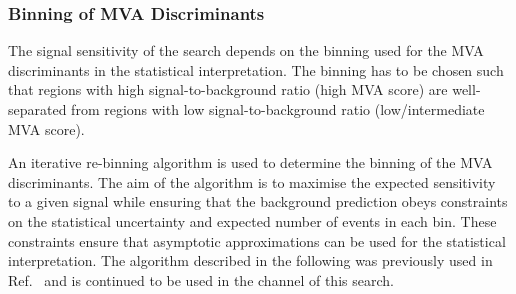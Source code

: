 \subsubsection{Binning of MVA Discriminants}%
\label{sec:binning_alg}

The signal sensitivity of the search depends on the binning used for the MVA
discriminants in the statistical interpretation. The binning has to be chosen
such that regions with high signal-to-background ratio (high MVA score) are
well-separated from regions with low signal-to-background ratio
(low/intermediate MVA score).

An iterative re-binning algorithm is used to determine the binning of the MVA
discriminants. The aim of the algorithm is to maximise the expected sensitivity
to a given signal while ensuring that the background prediction obeys
constraints on the statistical uncertainty and expected number of events in each
bin. These constraints ensure that asymptotic approximations can be used for the
statistical interpretation. The algorithm described in the following was
previously used in Ref.~\cite{HIGG-2016-16-witherratum} and is continued to be
used in the \hadhad channel of this search.

